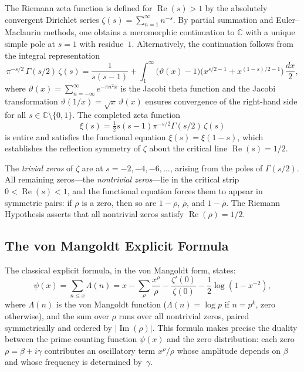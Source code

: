 \documentclass[11pt]{article}
\theoremstyle{remark}
\DeclareMathOperator{\Ima}{Im}
\DeclareMathOperator{\Rea}{Re}
\begin{document}
The Riemann zeta function is defined for $\Rea(s)>1$ by the absolutely convergent
Dirichlet series $\zeta(s)=\sum_{n=1}^\infty n^{-s}$.
By partial summation and Euler--Maclaurin methods, one obtains a meromorphic
continuation to $\mathbb{C}$ with a unique simple pole at $s=1$ with residue~$1$.
Alternatively, the continuation follows from the integral representation
\begin{equation}\label{eq:integral-rep}
  \pi^{-s/2}\,\Gamma(s/2)\,\zeta(s)
  = \frac{1}{s(s-1)}
  + \int_1^\infty \bigl(\vartheta(x)-1\bigr)\bigl(x^{s/2-1}+x^{(1-s)/2-1}\bigr)\,\frac{dx}{2},
\end{equation}
where $\vartheta(x)=\sum_{n=-\infty}^{\infty}e^{-\pi n^2 x}$ is the Jacobi theta
function and the Jacobi transformation $\vartheta(1/x)=\sqrt{x}\,\vartheta(x)$
ensures convergence of the right-hand side for all $s\in\mathbb{C}\setminus\{0,1\}$.
The completed zeta function
\[
  \xi(s) = \tfrac{1}{2}s(s-1)\pi^{-s/2}\Gamma(s/2)\,\zeta(s)
\]
is entire and satisfies the functional equation $\xi(s)=\xi(1-s)$, which
establishes the reflection symmetry of $\zeta$ about the critical line
$\Rea(s)=1/2$.

The \emph{trivial zeros} of $\zeta$ are at $s=-2,-4,-6,\ldots$, arising from the
poles of $\Gamma(s/2)$.
All remaining zeros---the \emph{nontrivial zeros}---lie in the critical strip
$0<\Rea(s)<1$, and the functional equation forces them to appear in symmetric
pairs: if $\rho$ is a zero, then so are $1-\rho$, $\bar{\rho}$, and
$1-\bar{\rho}$.
The Riemann Hypothesis asserts that all nontrivial zeros satisfy
$\Rea(\rho)=1/2$.

\subsection{The von Mangoldt Explicit Formula}
\label{subsec:vonMangoldt}

The classical explicit formula, in the von Mangoldt form, states:
\begin{equation}\label{eq:vonMangoldt}
  \psi(x) = \sum_{n\leq x}\Lambda(n) = x - \sum_{\rho}\frac{x^\rho}{\rho}
  - \frac{\zeta'(0)}{\zeta(0)} - \frac{1}{2}\log(1-x^{-2}),
\end{equation}
where $\Lambda(n)$ is the von Mangoldt function ($\Lambda(n)=\log p$ if $n=p^k$,
zero otherwise), and the sum over $\rho$ runs over all nontrivial zeros, paired
symmetrically and ordered by $|\Ima(\rho)|$.
This formula makes precise the duality between the prime-counting function
$\psi(x)$ and the zero distribution: each zero $\rho=\beta+i\gamma$ contributes
an oscillatory term $x^\rho/\rho$ whose amplitude depends on $\beta$ and whose
frequency is determined by~$\gamma$.
\end{document}
